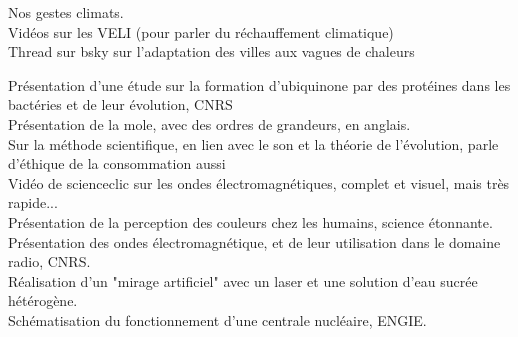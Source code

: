 
{\large {}}
\bigskip

Nos gestes climats.
\\[22pt]

Vidéos sur les VELI (pour parler du réchauffement climatique)
\\[22pt]

Thread sur bsky sur l'adaptation des villes aux vagues de chaleurs

Présentation d'une étude sur la formation d'ubiquinone par des protéines dans les bactéries et de leur évolution, CNRS
\\[8pt]

Présentation de la mole, avec des ordres de grandeurs, en anglais.
\\[22pt]

Sur la méthode scientifique, en lien avec le son et la théorie de l'évolution, parle d'éthique de la consommation aussi
\\[22pt]


Vidéo de scienceclic sur les ondes électromagnétiques, complet et visuel, mais très rapide...
\\[22pt]

Présentation de la perception des couleurs chez les humains, science étonnante.
\\[22pt]

Présentation des ondes électromagnétique, et de leur utilisation dans le domaine radio, CNRS.
\\[8pt]

Réalisation d'un "mirage artificiel" avec un laser et une solution d'eau sucrée hétérogène.
\\[22pt]


Schématisation du fonctionnement d'une centrale nucléaire, ENGIE.
\\[22pt]

